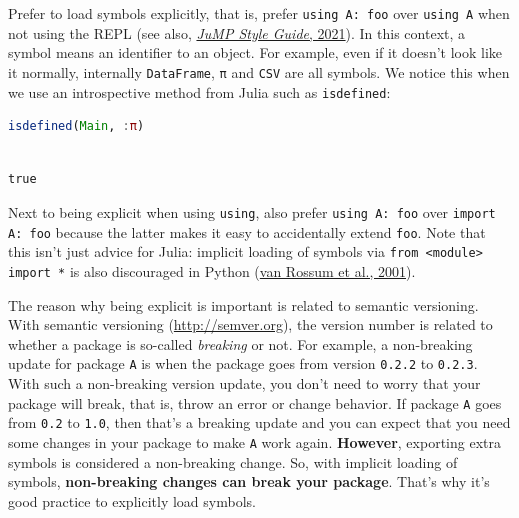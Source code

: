 \documentclass[
  notoc %
]{tufte-book}
\newcommand{\passthrough}[1]{#1}
\begin{document}
Prefer to load symbols explicitly, that is, prefer
\passthrough{\lstinline!using A: foo!} over
\passthrough{\lstinline!using A!} when not using the REPL (see also,
\protect\hyperlink{ref-jump2021using}{\emph{JuMP Style Guide}, 2021}).
In this context, a symbol means an identifier to an object. For example,
even if it doesn't look like it normally, internally
\passthrough{\lstinline!DataFrame!}, \passthrough{\lstinline!π!} and
\passthrough{\lstinline!CSV!} are all symbols. We notice this when we
use an introspective method from Julia such as
\passthrough{\lstinline!isdefined!}:

\begin{lstlisting}[language=Julia]
isdefined(Main, :π)
\end{lstlisting}

\begin{lstlisting}[language=Output]

true

\end{lstlisting}

Next to being explicit when using \passthrough{\lstinline!using!}, also
prefer \passthrough{\lstinline!using A: foo!} over
\passthrough{\lstinline!import A: foo!} because the latter makes it easy
to accidentally extend \passthrough{\lstinline!foo!}. Note that this
isn't just advice for Julia: implicit loading of symbols via
\passthrough{\lstinline!from <module> import *!} is also discouraged in
Python (\protect\hyperlink{ref-pep8}{van Rossum et al., 2001}).

The reason why being explicit is important is related to semantic
versioning. With semantic versioning (\url{http://semver.org}), the
version number is related to whether a package is so-called
\emph{breaking} or not. For example, a non-breaking update for package
\passthrough{\lstinline!A!} is when the package goes from version
\passthrough{\lstinline!0.2.2!} to \passthrough{\lstinline!0.2.3!}. With
such a non-breaking version update, you don't need to worry that your
package will break, that is, throw an error or change behavior. If
package \passthrough{\lstinline!A!} goes from
\passthrough{\lstinline!0.2!} to \passthrough{\lstinline!1.0!}, then
that's a breaking update and you can expect that you need some changes
in your package to make \passthrough{\lstinline!A!} work again.
\textbf{However}, exporting extra symbols is considered a non-breaking
change. So, with implicit loading of symbols, \textbf{non-breaking
changes can break your package}. That's why it's good practice to
explicitly load symbols.
\end{document}
